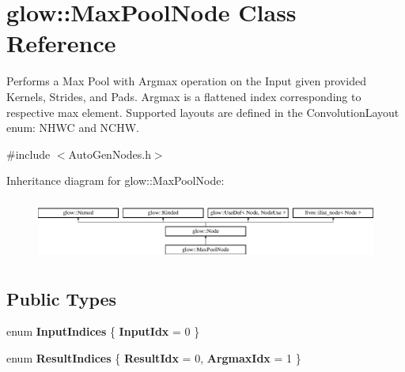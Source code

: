 \hypertarget{classglow_1_1_max_pool_node}{}\section{glow\+:\+:Max\+Pool\+Node Class Reference}
\label{classglow_1_1_max_pool_node}


Performs a Max Pool with Argmax operation on the Input given provided Kernels, Strides, and Pads. Argmax is a flattened index corresponding to respective max element. Supported layouts are defined in the Convolution\+Layout enum\+: N\+H\+WC and N\+C\+HW.  




{\ttfamily \#include $<$Auto\+Gen\+Nodes.\+h$>$}

Inheritance diagram for glow\+:\+:Max\+Pool\+Node\+:\begin{figure}[H]
\begin{center}
\leavevmode
\includegraphics[height=2.028986cm]{classglow_1_1_max_pool_node}
\end{center}
\end{figure}
\subsection*{Public Types}
\begin{DoxyCompactItemize}
\item 
\mbox{\label{classglow_1_1_max_pool_node_a9936918cc65c34955e0c40c2b31630f7}} 
enum {\bfseries Input\+Indices} \{ {\bfseries Input\+Idx} = 0
 \}
\item 
\mbox{\label{classglow_1_1_max_pool_node_addcbe83d1f3b233d4e7ab90f58bd341c}} 
enum {\bfseries Result\+Indices} \{ {\bfseries Result\+Idx} = 0, 
{\bfseries Argmax\+Idx} = 1
 \}
\end{DoxyCompactItemize}
